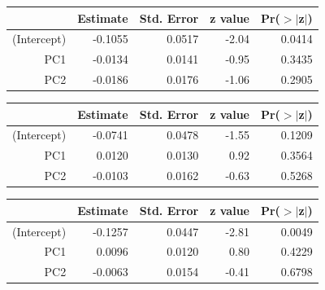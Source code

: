 \documentclass[a4paper,12pt]{Latex/Classes/PhDthesisPSnPDF}
\begin{document}
\begin{center}
\begin{table}[ht]
\centering
\begin{tabular}{rrrrr}
  \hline
 & Estimate & Std. Error & z value & Pr($>$$|$z$|$) \\ 
  \hline
(Intercept) & -0.1055 & 0.0517 & -2.04 & 0.0414 \\ 
  PC1 & -0.0134 & 0.0141 & -0.95 & 0.3435 \\ 
  PC2 & -0.0186 & 0.0176 & -1.06 & 0.2905 \\ 
   \hline
\end{tabular}
\end{table}\end{center}

\begin{center}
\begin{table}[ht]
\centering
\begin{tabular}{rrrrr}
  \hline
 & Estimate & Std. Error & z value & Pr($>$$|$z$|$) \\ 
  \hline
(Intercept) & -0.0741 & 0.0478 & -1.55 & 0.1209 \\ 
  PC1 & 0.0120 & 0.0130 & 0.92 & 0.3564 \\ 
  PC2 & -0.0103 & 0.0162 & -0.63 & 0.5268 \\ 
   \hline
\end{tabular}
\end{table}\end{center}

\newpage

\begin{center}
\begin{table}[ht]
\centering
\begin{tabular}{rrrrr}
  \hline
 & Estimate & Std. Error & z value & Pr($>$$|$z$|$) \\ 
  \hline
(Intercept) & -0.1257 & 0.0447 & -2.81 & 0.0049 \\ 
  PC1 & 0.0096 & 0.0120 & 0.80 & 0.4229 \\ 
  PC2 & -0.0063 & 0.0154 & -0.41 & 0.6798 \\ 
   \hline
\end{tabular}
\end{table}\end{center}
\end{document}
